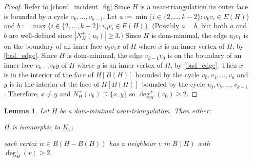 \documentclass[a4paper,UKenglish,cleveref, autoref, thm-restate]{lipics-v2021}
\newtheorem{lem}{Lemma}
\begin{document}
\begin{proof}
  Refer to \cref{chord_incident_fig}
  Since $H$ is a near-triangulation its outer face is bounded by a cycle $v_0,\ldots,v_{k-1}$.  Let $a:=\min\{i\in\{2,\ldots,k-2\}:v_0v_i\in E(H)\}$ and $b:=\max\{i\in\{2,\ldots,k-2\}:v_0v_i\in E(H)\}$. (Possibly $a=b$, but both $a$ and $b$ are well-defined since $|N^+_H(v_0)|\ge 3$.)   Since $H$ is dom-minimal, the edge $v_0v_1$ is on the boundary of an inner face $v_0v_1x$ of $H$ where $x$ is an inner vertex of $H$, by \cref{bad_edge}.  Since $H$ is dom-minimal, the edge $v_{k-1}v_0$ is on the boundary of an inner face $v_{k-1}v_0y$ of $H$ where $y$ is an inner vertex of $H$, by \cref{bad_edge}.  Then $x$ is in the interior of the face of $H[B(H)]$ bounded by the cycle $v_0,v_1,\ldots,v_a$ and $y$ is in the interior of the face of $H[B(H)]$ bounded by the cycle $v_0,v_b,\ldots,v_{k-1}$.  Therefore, $x\neq y$ and $N^+_H(v_0)\supseteq\{x,y\}$ so $\deg^+_H(v_0)\ge 2$.
\end{proof}

\begin{lem}\label{degree_2_outer_neighbour}
  Let $H$ be a dom-minimal near-triangulation. Then either:
  \begin{compactenum}
    \item $H$ is isomorphic to $K_4$;
    \item each vertex $w\in B(H-B(H))$ has a neighbour $v$ in $B(H)$ with $\deg^+_H(v)\ge 2$.
  \end{compactenum}
\end{lem}
\end{document}
